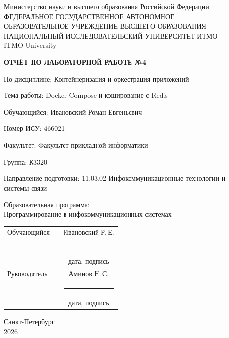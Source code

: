 \documentclass[14pt,a4paper,oneside]{extreport}
\newcommand{\LabNumber}{4}
\newcommand{\LabTitle}{Docker Compose и кэширование с Redis}
\newcommand{\CourseName}{Контейнеризация и оркестрация приложений}
\newcommand{\StudentName}{Ивановский Роман Евгеньевич}
\newcommand{\StudentShortName}{Ивановский Р.\,Е.}
\newcommand{\StudentISU}{466021}
\newcommand{\StudentGroup}{К3320}
\newcommand{\FacultyName}{Факультет прикладной информатики}
\newcommand{\DegreeProgramme}{11.03.02 Инфокоммуникационные технологии и системы связи}
\newcommand{\EducationProgramme}{Программирование в инфокоммуникационных системах}
\newcommand{\TeacherName}{Аминов Н.\,С.}
\newcommand{\ReportCity}{Санкт-Петербург}
\newcommand{\ReportYear}{2026}
\begin{document}
\begin{titlepage}
  \thispagestyle{empty}
  \begin{center}
    \fontsize{12pt}{16pt}\selectfont
    Министерство науки и высшего образования Российской Федерации\\[0.25\baselineskip]
    ФЕДЕРАЛЬНОЕ ГОСУДАРСТВЕННОЕ АВТОНОМНОЕ\\
    ОБРАЗОВАТЕЛЬНОЕ УЧРЕЖДЕНИЕ ВЫСШЕГО ОБРАЗОВАНИЯ\\[0.25\baselineskip]
    НАЦИОНАЛЬНЫЙ ИССЛЕДОВАТЕЛЬСКИЙ УНИВЕРСИТЕТ ИТМО\\
    ITMO University
  \end{center}
  \vspace{0.8\baselineskip}
  \begin{center}
    \textbf{ОТЧЁТ ПО ЛАБОРАТОРНОЙ РАБОТЕ №\LabNumber}
  \end{center}
  \vspace{0.4\baselineskip}
  \begingroup
  \setlength{\parindent}{0pt}
  По дисциплине: \CourseName\par\medskip
  Тема работы: \LabTitle\par\medskip
  Обучающийся: \StudentName\par\medskip
  Номер ИСУ: \StudentISU\par\medskip
  Факультет: \FacultyName\par\medskip
  Группа: \StudentGroup\par\medskip
  Направление подготовки: \DegreeProgramme\par\medskip
  Образовательная программа:\\\EducationProgramme\par
  \endgroup
  \vfill
  \begin{tabularx}{\textwidth}{@{}lXc@{}}
    Обучающийся & & \StudentShortName\\
    & & \rule{38mm}{0.4pt}\\[-0.25\baselineskip]
    & & {\fontsize{12pt}{14pt}\selectfont дата, подпись}\\[0.6\baselineskip]
    Руководитель & & \TeacherName\\
    & & \rule{38mm}{0.4pt}\\[-0.25\baselineskip]
    & & {\fontsize{12pt}{14pt}\selectfont дата, подпись}
  \end{tabularx}
  \vfill
  \begin{center}
    \ReportCity\\
    \ReportYear
  \end{center}
\end{titlepage}
\setcounter{page}{2}
\tableofcontents

\end{document}
